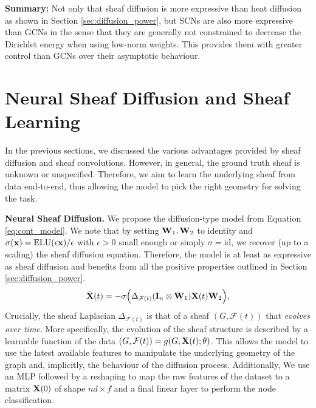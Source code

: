 \documentclass{article}
\def\eps{{\epsilon}}
\def\vx{{\bf{x}}}
\def\mI{{\bf{I}}}
\def\mW{{\bf{W}}}
\def\mX{{\bf{X}}}
\def\gF{{\mathcal{F}}}
\begin{document}
\begin{tcolorbox}[boxsep=0mm,left=2.5mm,right=2.5mm]
\textbf{Summary:} Not only that sheaf diffusion is more expressive than heat diffusion as shown in Section \ref{sec:diffusion_power}, but SCNs are also more expressive than GCNs in the sense that they are generally not constrained to decrease the Dirichlet energy when using low-norm weights. This provides them with greater control than GCNs over their asymptotic behaviour.  
\end{tcolorbox}
\vspace{-5pt}

\section{Neural Sheaf Diffusion and Sheaf Learning}\label{sec:sheaf_learning}

In the previous sections, we discussed the various advantages provided by sheaf diffusion and sheaf convolutions. However, in general, the ground truth sheaf is unknown or unspecified. Therefore, we aim to learn the underlying sheaf from data end-to-end, thus allowing the model to pick the right geometry for solving the task. 

\textbf{Neural Sheaf Diffusion. } We propose the  diffusion-type model from Equation \ref{eq:cont_model}. We note that by setting $\mW_1, \mW_2$ to identity and $\sigma(\vx) = \text{ELU}(\eps\vx)/\eps$ with $\eps>0$ small enough or simply $\sigma=\text{id}$, we recover (up to a scaling) the sheaf diffusion equation. Therefore, the model is at least as expressive as sheaf diffusion and benefits from all the positive properties outlined in Section \ref{sec:diffusion_power}. 
\begin{equation}\label{eq:cont_model}
    \dot{\mX}(t) = - \sigma \Big(\Delta_{\gF(t)} (\mI_n \otimes \mW_1) \mX(t) \mW_2 \Big),
\end{equation}
Crucially, the sheaf Laplacian $\Delta_{\gF(t)}$ is that of a sheaf $(G, \gF(t))$ that {\em evolves over time}. More specifically, the evolution of the sheaf structure is described by a learnable function of the data $(G, \gF(t)) = g(G, \mX(t) ; \theta)$. This allows the model to use the latest available features to manipulate the underlying geometry of the graph and, implicitly, the behaviour of the diffusion process. Additionally, We use an MLP followed by a reshaping to map the raw features of the dataset to a matrix $\mX(0)$ of shape $nd \times f$ and a final linear layer to perform the node classification. 
\end{document}
